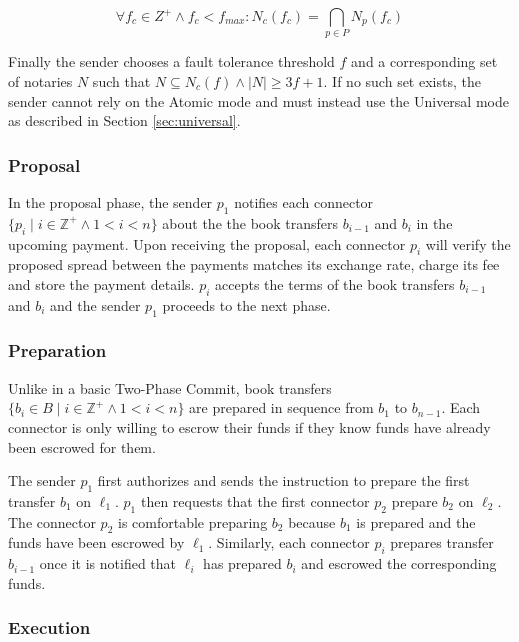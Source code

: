 \documentclass[letterpaper,twocolumn,10pt]{article}
\begin{document}
\begin{equation}
\forall f_c \in Z^+ \land f_c < f_{max} : N_c(f_c) = \bigcap_{p \in P} N_p(f_c)
\end{equation}

Finally the sender chooses a fault tolerance threshold $f$ and a corresponding set of notaries $N$ such that $N \subseteq N_c(f) \land \left\vert{N}\right\vert \geq 3f+1$. If no such set exists, the sender cannot rely on the Atomic mode and must instead use the Universal mode as described in Section \ref{sec:universal}.


\subsubsection{Proposal}

In the proposal phase, the sender $p_1$ notifies each connector $ \{ p_i \mid i \in \mathbb{Z}^+ \land 1 < i < n \} $ about the the book transfers $b_{i-1}$ and $b_i$ in the upcoming payment. Upon receiving the proposal, each connector $p_i$ will verify the proposed spread between the payments matches its exchange rate, charge its fee and store the payment details. $p_i$ accepts the terms of the book transfers $b_{i-1}$ and $b_i$ and the sender $p_1$ proceeds to the next phase.


\subsubsection{Preparation}

Unlike in a basic Two-Phase Commit, book transfers 
$ \{ b_i \in B \mid i \in \mathbb{Z}^+ \land 1 < i < n \} $
are prepared in sequence from $b_1$ to $b_{n-1}$. Each connector is only willing to escrow their funds if they know funds have already been escrowed for them. 

The sender $p_1$ first authorizes and sends the instruction to prepare the first transfer $b_1$ on $\ell_1$. $p_1$ then requests that the first connector $p_2$ prepare $b_2$ on $\ell_2$. The connector $p_2$ is comfortable preparing $b_2$ because $b_1$ is prepared and the funds have been escrowed by $\ell_1$. Similarly, each connector $p_i$ prepares transfer $b_{i-1}$ once it is notified that $\ell_i$ has prepared $b_i$ and escrowed the corresponding funds.


\subsubsection{Execution}
\end{document}
